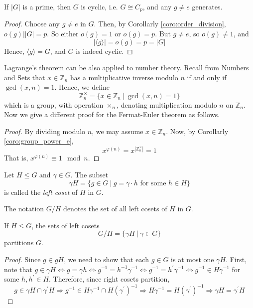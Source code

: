 \documentclass[10pt, a4paper, twoside]{report}
\begin{document}
\begin{corollary}
    If \(|G|\) is a prime, then \(G\) is cyclic, i.e. \(G\cong C_p\), and any \(g\neq e\) generates. 
\end{corollary}
\begin{proof}
    Choose any \(g\neq e\) in \(G\). Then, by Corollarly \ref{coro:order_division}, \(o(g)\big||G|=p\). So either \(o(g)=1\) or \(o(g)=p\). But \(g\neq e\), so \(o(g)\neq 1\), and 
    \[|\langle g\rangle|=o(g)=p=|G|\]
    Hence, \(\langle g\rangle =G\), and \(G\) is indeed cyclic.
\end{proof}
\begin{example}
Lagrange's theorem can be also applied to number theory. Recall from Numbers and Sets that \(x\in\mathbb{Z}_n\) has a multiplicative inverse modulo \(n\) if and only if \(\gcd(x,n)=1\). Hence, we define 
\[\mathbb{Z}_n^\times=\{x\in\mathbb{Z}_n\:|\:\gcd(x,n)=1\}\]
which is a group, with operation \(\times_n\), denoting multiplication modulo \(n\) on \(\mathbb{Z}_n\). Now we give a different proof for the Fermat-Euler theorem as follows.
\begin{proof}
    By dividing modulo \(n\), we may assume \(x\in\mathbb{Z}_n\). Now, by Corollarly \ref{coro:group_power_e},
    \[x^{\varphi(n)}=x^{|\mathbb{Z}_n^\times|}=1\]
    That is, \(x^{\varphi(n)}\equiv 1\mod n\).
\end{proof}
\end{example}
\begin{definition}
    Let \(H\leq G\) and \(\gamma\in G\). The subset 
    \[\gamma H=\{g\in G\:|\:g=\gamma\cdot h\text{  for some \(h\in H\)}\}\]
    is called the \emph{left coset} of \(H\) in \(G\).
\end{definition}
The notation \(G/H\) denotes the set of all left cosets of \(H\) in \(G\).
\begin{lemma}
    If \(H\leq G\), the sets of left cosets 
    \[G/H=\{\gamma H\:|\:\gamma\in G\}\]
    partitions \(G\).
    \label{lemma:coset_partition}
\end{lemma}
\begin{proof}
    Since \(g\in gH\), we need to show that each \(g\in G\) is at most one \(\gamma H\). First, note that \(g\in\gamma H\Leftrightarrow g=\gamma h\Leftrightarrow g^{-1}=h^{-1}\gamma^{-1}\Leftrightarrow g^{-1}=h^\prime\gamma^{-1}\Leftrightarrow g^{-1}\in H\gamma^{-1}\) for some \(h,h^\prime\in H\). Therefore, since right cosets partition,
    \[g\in\gamma H\cap\gamma^\prime H\Rightarrow g^{-1}\in H\gamma^{-1}\cap H(\gamma^\prime)^{-1}\Rightarrow H\gamma^{-1}=H(\gamma^\prime)^{-1}\Rightarrow \gamma H=\gamma^\prime H\]
\end{proof}
\end{document}
